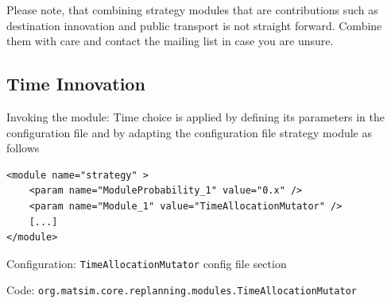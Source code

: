 Please note, that combining strategy modules that are \glspl{contribution} such as destination innovation and public transport is not straight forward. Combine them with care and contact the mailing list in case you are unsure.

%


\subsection{Time Innovation}
\label{sec:timechoice}
\begin{compactitem}
\item Invoking the module: Time choice is applied by defining its parameters in the configuration file and by adapting the configuration file strategy module as follows
%
\begin{lstlisting}
<module name="strategy" >
    <param name="ModuleProbability_1" value="0.x" />
    <param name="Module_1" value="TimeAllocationMutator" />
    [...]
</module>
\end{lstlisting}
%
\item Configuration: \lstinline|TimeAllocationMutator| config file section
\item Code: \lstinline|org.matsim.core.replanning.modules.TimeAllocationMutator|
\end{compactitem}

